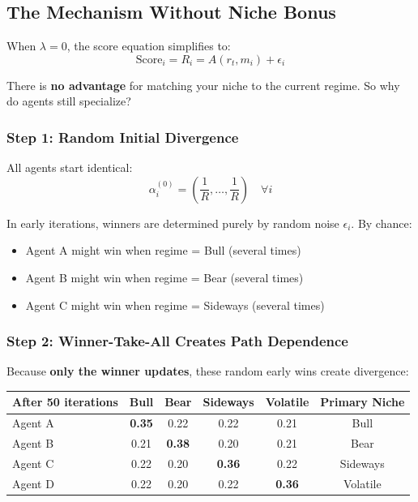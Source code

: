 \documentclass[11pt,a4paper]{article}
\theoremstyle{definition}
\theoremstyle{plain}
\begin{document}
\subsection{The Mechanism Without Niche Bonus}

When $\lambda = 0$, the score equation simplifies to:
\begin{equation}
\text{Score}_i = R_i = A(r_t, m_i) + \epsilon_i
\end{equation}

There is \textbf{no advantage} for matching your niche to the current regime. So why do agents still specialize?

\subsubsection{Step 1: Random Initial Divergence}

All agents start identical:
\begin{equation}
\alpha_i^{(0)} = \left(\frac{1}{R}, \ldots, \frac{1}{R}\right) \quad \forall i
\end{equation}

In early iterations, winners are determined purely by random noise $\epsilon_i$. By chance:
\begin{itemize}
    \item Agent A might win when regime = Bull (several times)
    \item Agent B might win when regime = Bear (several times)
    \item Agent C might win when regime = Sideways (several times)
\end{itemize}

\subsubsection{Step 2: Winner-Take-All Creates Path Dependence}

Because \textbf{only the winner updates}, these random early wins create divergence:

\begin{center}
\begin{tabular}{lccccc}
\toprule
After 50 iterations & Bull & Bear & Sideways & Volatile & Primary Niche \\
\midrule
Agent A & \textbf{0.35} & 0.22 & 0.22 & 0.21 & Bull \\
Agent B & 0.21 & \textbf{0.38} & 0.20 & 0.21 & Bear \\
Agent C & 0.22 & 0.20 & \textbf{0.36} & 0.22 & Sideways \\
Agent D & 0.22 & 0.20 & 0.22 & \textbf{0.36} & Volatile \\
\bottomrule
\end{tabular}
\end{center}
\end{document}
